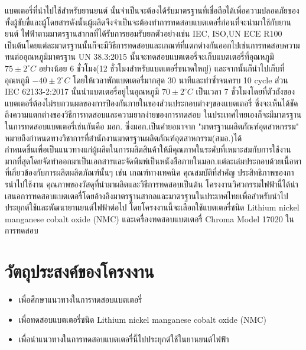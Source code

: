 \newline 
\hspace*{2cm} แบตเตอรี่ที่นำไปใช้สำหรับยานยนต์ นั้นจำเป็นจะต้องได้รับมาตรฐานที่เชื่อถือได้เพื่อความปลอดภัยของทั้งผู้ขับขี่และผู้โดยสารดังนั้นผู้ผลิตจึงจำเป็นจะต้องทำการทดสอบแบตเตอรี่ก่อนที่จะนำมาใช้กับยานยนต์ ไฟฟ้าตามมาตรฐานสากลที่ได้รับการยอมรับยกตัวอย่างเช่น IEC, ISO,UN ECE R100 เป็นต้นโดยแต่ละมาตรฐานนั้นก็จะมีวิธีการทดสอบและเกณฑ์ที่แตกต่างกันออกไปเช่นการทดสอบความทนต่ออุณหภูมิมาตรฐาน UN 38.3:2015 นั้นจะทดสอบแบตเตอรี่จะเก็บแบตเตอรี่ที่อุณหภูมิ $75\pm 2^{\circ}C$  อย่างน้อย 6 ชั่วโมง(12 ชั่วโมงสำหรับแบตเตอรี่ขนาดใหญ่) และจากนั้นก็นำไปเก็บที่อุณหภูมิ $-40\pm 2^{\circ}C$ โดยให้เวลาพักแบตเตอรี่มากสุด 30 นาทีและทำซ้ำจนครบ 10 cycle ส่วน IEC 62133-2:2017 นั้นนำแบตเตอรี่อยู่ในอุณหภูมิ $70\pm 2^{\circ}C$ เป็นเวลา 7 ชั่วโมงโดยที่ตัวถังของแบตเตอรี่ต้องไม่รบกวนผลของการป้องกันภายในของส่วนประกอบต่างๆของแบตเตอรี่\cite{ruiz2018review} ซึ่งจะเห็นได้ชัดถึงความแตกต่างของวิธีการทดสอบและความยากง่ายของการทดสอบ ในประเทศไทยเองก็จะมีมาตรฐานในการทดสอบแบตเตอรี่เช่นกันคือ มอก. ซึ่งมอก.เป็นคํายอมาจาก "มาตรฐานผลิตภัณฑ์อุตสาหกรรม" หมายถึงกําหนดทางวิชาการที่สำนักงานมาตรฐานผลิตภัณฑ์อุตสาหกรรม(สมอ.)ได้
\\กําหนดขึ้นเพื่อเป็นแนวทางแก่ผู้ผลิตในการผลิตสินค้าให้มีคุณภาพในระดับที่เหมาะสมกับการใช้งานมากที่สุดโดยจัดทำออกมาเป็นเอกสารและจัดพิมพ์เป็นหนังสือภายในมอก.แต่ละเล่มประกอบด้วยเนื้อหาที่เกี่ยวข้องกับการผลิตผลิตภัณฑ์นั้นๆ 
เช่น เกณฑ์ทางเทคนิค คุณสมบัติที่สําคัญ ประสิทธิภาพของการนําไปใช้งาน คุณภาพของวัสดุที่นํามาผลิตและวิธีการทดสอบเป็นต้น
\newline 
\hspace*{2cm} โครงงานวิศวกรรมไฟฟ้านี้ได้นำเสนอการทดสอบแบตเตอรี่โดยอ้างอิงมาตรฐานสากลและมาตรฐานในประเทศไทยเพื่อสำหรับนำไปประยุกต์ใช้และพัฒนายานยนต์ไฟฟ้าต่อไป โดยโครงงานนี้จะเลือกใช้แบตเตอรี่ชนิด Lithium nickel manganese cobalt oxide (NMC) และเครื่องทดสอบแบตเตอรี่ Chroma Model 17020 ในการทดสอบ
\section{วัตถุประสงค์ของโครงงาน}
\begin{itemize}
  \item เพื่อศึกษาแนวทางในการทดสอบแบตเตอรี่
  \item เพื่อทดสอบแบตเตอรี่ชนิด Lithium nickel manganese cobalt oxide (NMC)
  \item เพื่อนำแนวทางในการทดสอบแบตเตอรี่นี้ไปประยุกต์ใช้ในยานยนต์ไฟฟ้า
\end{itemize}
